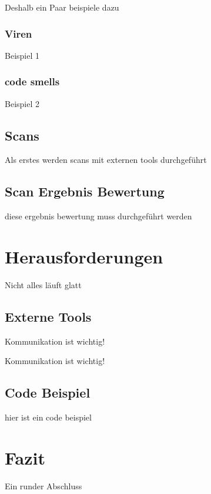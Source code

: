 \documentclass[
	12pt, %
	a4paper,
	liststotoc, %
	bibtotoc, %
	pointlessnumbers, %
	ngerman, %
	headsepline, %
	oneside %
	]{scrbook} %
\begin{document}
Deshalb ein Paar beispiele dazu

\subsection{Viren}\label{subsec:viren_beispiel}
Beispiel 1
\subsection{code smells}\label{subsec:codesmells_beispiel}
Beispiel 2

\section{Scans}\label{sec:scans}

Als erstes werden scans mit externen tools durchgeführt

\section{Scan Ergebnis Bewertung}\label{sec:scan_bewertung}

diese ergebnis bewertung muss durchgeführt werden

\chapter{Herausforderungen}\label{ch:herausforderungen}

Nicht alles läuft glatt

\section{Externe Tools}\label{sec:externe_tools}

Kommunikation ist wichtig!

Kommunikation ist wichtig!

\section{Code Beispiel}\label{sec:code_beispiel}

hier ist ein code beispiel

\chapter{Fazit}\label{ch:fazit}


Ein runder Abschluss
\end{document}

